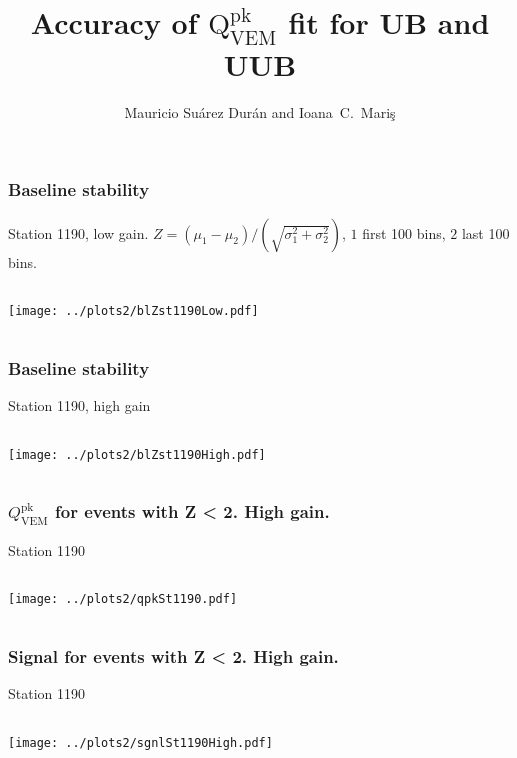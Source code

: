 \documentclass[aspectratio=169]{beamer}
\title{Accuracy of $\mathrm{Q}^{\mathrm{pk}}_{\mathrm{VEM}}$ fit for UB and UUB}
\author{
  Mauricio Su\'arez Dur\'an and Ioana~C.~Mari\c{s}
}
\institute{IIHE-ULB}
\begin{document}
\begin{frame}
  \titlepage
\end{frame}


\begin{frame}
  \frametitle{Baseline stability}
  Station 1190, low gain. $Z=(\mu_1-\mu_2)/\left(\sqrt{\sigma_1^2 +
  \sigma_2^2}\right)$, $1$ first 100 bins, $2$ last 100 bins.
  \vspace{0.1cm}
  \begin{columns}
    \begin{column}{1.\textwidth}
      \texttt{[image: ../plots2/blZst1190Low.pdf]}
    \end{column}
  \end{columns}
\end{frame}

\begin{frame}
  \frametitle{Baseline stability}
  Station 1190, high gain
  \vspace{0.1cm}
  \begin{columns}
    \begin{column}{1.\textwidth}
      \texttt{[image: ../plots2/blZst1190High.pdf]}
    \end{column}
  \end{columns}
\end{frame}

\begin{frame}
  \frametitle{$Q^{\mathrm{pk}}_\mathrm{VEM}$ for events with Z <
  2. High gain.}
  Station 1190
  \vspace{0.1cm}
  \begin{columns}
    \begin{column}{1.\textwidth}
      \texttt{[image: ../plots2/qpkSt1190.pdf]}
    \end{column}
  \end{columns}
\end{frame}

\begin{frame}
  \frametitle{Signal for events with Z < 2. High gain.}
  Station 1190
  \vspace{0.1cm}
  \begin{columns}
    \begin{column}{1.\textwidth}
      \texttt{[image: ../plots2/sgnlSt1190High.pdf]}
    \end{column}
  \end{columns}
\end{frame}
\end{document}
